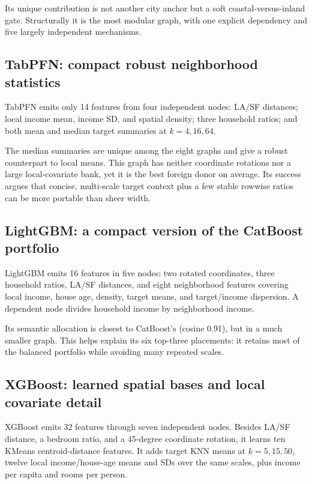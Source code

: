 \documentclass[10pt]{article}
\begin{document}
Its unique contribution is not another city anchor but a soft
coastal-versus-inland gate.  Structurally it is the most modular graph, with
one explicit dependency and five largely independent mechanisms.

\subsection{TabPFN: compact robust neighborhood statistics}

TabPFN emits only 14 features from four independent nodes: LA/SF distances;
local income mean, income SD, and spatial density; three household ratios; and
both mean and median target summaries at \(k=4,16,64\).

The median summaries are unique among the eight graphs and give a robust
counterpart to local means.  This graph has neither coordinate rotations nor
a large local-covariate bank, yet it is the best foreign donor on average.
Its success argues that concise, multi-scale target context plus a few stable
rowwise ratios can be more portable than sheer width.

\subsection{LightGBM: a compact version of the CatBoost portfolio}

LightGBM emits 16 features in five nodes: two rotated coordinates, three
household ratios, LA/SF distances, and eight neighborhood features covering
local income, house age, density, target means, and target/income dispersion.
A dependent node divides household income by neighborhood income.

Its semantic allocation is closest to CatBoost's (cosine 0.91), but in a much
smaller graph.  This helps explain its six top-three placements: it retains
most of the balanced portfolio while avoiding many repeated scales.

\subsection{XGBoost: learned spatial bases and local covariate detail}

XGBoost emits 32 features through seven independent nodes.  Besides LA/SF
distance, a bedroom ratio, and a 45-degree coordinate rotation, it learns ten
KMeans centroid-distance features.  It adds target KNN means at
\(k=5,15,50\), twelve local income/house-age means and SDs over the same
scales, plus income per capita and rooms per person.
\end{document}
